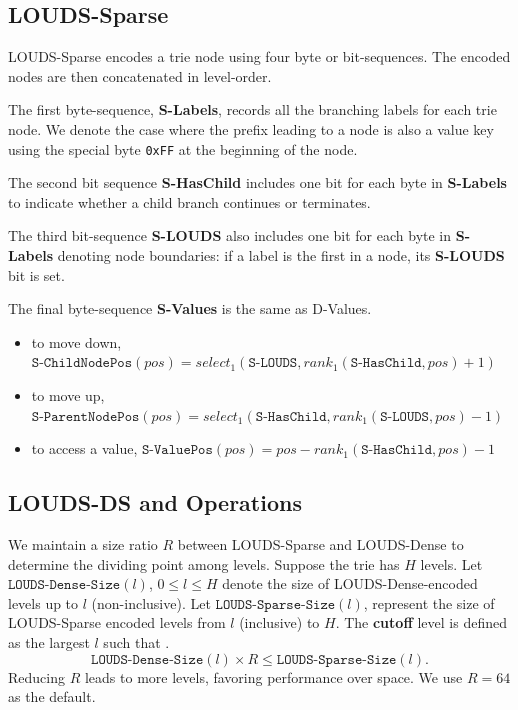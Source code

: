 \documentclass[11pt]{article}
\begin{document}
\subsection{LOUDS-Sparse}
\label{sec:org7020807}
LOUDS-Sparse encodes a trie node using four byte or bit-sequences. The encoded nodes are then
concatenated in level-order.

The first byte-sequence, \textbf{S-Labels}, records all the branching labels for each trie node. We denote
the case where the prefix leading to a node is also a value key using the special byte \texttt{0xFF} at the
beginning of the node.

The second bit sequence \textbf{S-HasChild} includes one bit for each byte in \textbf{S-Labels} to indicate whether a
child branch continues or terminates.

The third bit-sequence \textbf{S-LOUDS} also includes one bit for each byte in \textbf{S-Labels} denoting node
boundaries: if a label  is the first in a node, its \textbf{S-LOUDS} bit is set.

The final byte-sequence \textbf{S-Values} is the same as D-Values.
\begin{itemize}
\item to move down, \(\texttt{S-ChildNodePos}(pos)=select_1(\texttt{S-LOUDS},rank_1(\texttt{S-HasChild},pos)+1)\)
\item to move up,
\(\texttt{S-ParentNodePos}(pos)=select_1(\texttt{S-HasChild},rank_1(\texttt{S-LOUDS},pos)-1)\)
\item to access a value, \(\texttt{S-ValuePos}(pos)=pos-rank_1(\texttt{S-HasChild},pos)-1\)
\end{itemize}
\subsection{LOUDS-DS and Operations}
\label{sec:org0749835}
We maintain a size ratio \(R\) between LOUDS-Sparse and LOUDS-Dense to determine the dividing point
among levels. Suppose the trie has \(H\) levels. Let \(\texttt{LOUDS-Dense-Size}(l)\),
\(0 \le l \le H\) denote the size of LOUDS-Dense-encoded levels up to \(l\) (non-inclusive). Let
\(\texttt{LOUDS-Sparse-Size}(l)\), represent the size of LOUDS-Sparse encoded levels from \(l\)
(inclusive) to \(H\). The \textbf{cutoff} level is defined as the largest \(l\) such that .
\begin{equation*}
\texttt{LOUDS-Dense-Size}(l ) × R ≤ \texttt{LOUDS-Sparse-Size}(l).
\end{equation*}
Reducing \(R\) leads to more levels, favoring performance over space. We use \(R=64\) as the default.
\end{document}
